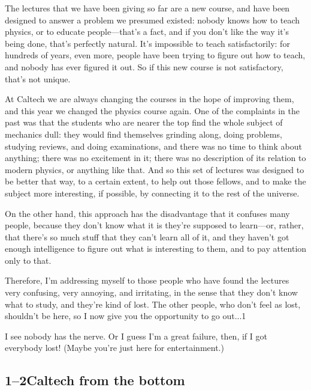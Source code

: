 \documentclass[11pt,oneside]{article}
\begin{document}
The lectures that we have been giving so far are a new course, and have been designed to answer a problem we presumed existed: nobody knows how to teach physics, or to educate people---that's a fact, and if you don't like the way it's being done, that's perfectly natural. It's impossible to teach satisfactorily: for hundreds of years, even more, people have been trying to figure out how to teach, and nobody has ever figured it out. So if this new course is not satisfactory, that's not unique.\par

At Caltech we are always changing the courses in the hope of improving them, and this year we changed the physics course again. One of the complaints in the past was that the students who are nearer the top find the whole subject of mechanics dull: they would find themselves grinding along, doing problems, studying reviews, and doing examinations, and there was no time to think about anything; there was no excitement in it; there was no description of its relation to modern physics, or anything like that. And so this set of lectures was designed to be better that way, to a certain extent, to help out those fellows, and to make the subject more interesting, if possible, by connecting it to the rest of the universe.\par

On the other hand, this approach has the disadvantage that it confuses many people, because they don't know what it is they're supposed to learn---or, rather, that there's so much stuff that they can't learn all of it, and they haven't got enough intelligence to figure out what is interesting to them, and to pay attention only to that.\par

Therefore, I'm addressing myself to those people who have found the lectures very confusing, very annoying, and irritating, in the sense that they don't know what to study, and they're kind of lost. The other people, who don't feel as lost, shouldn't be here, so I now give you the opportunity to go out...1\par

I see nobody has the nerve. Or I guess I'm a great failure, then, if I got everybody lost! (Maybe you're just here for entertainment.)\par

\subsection*{1--2Caltech from the bottom}
\end{document}
